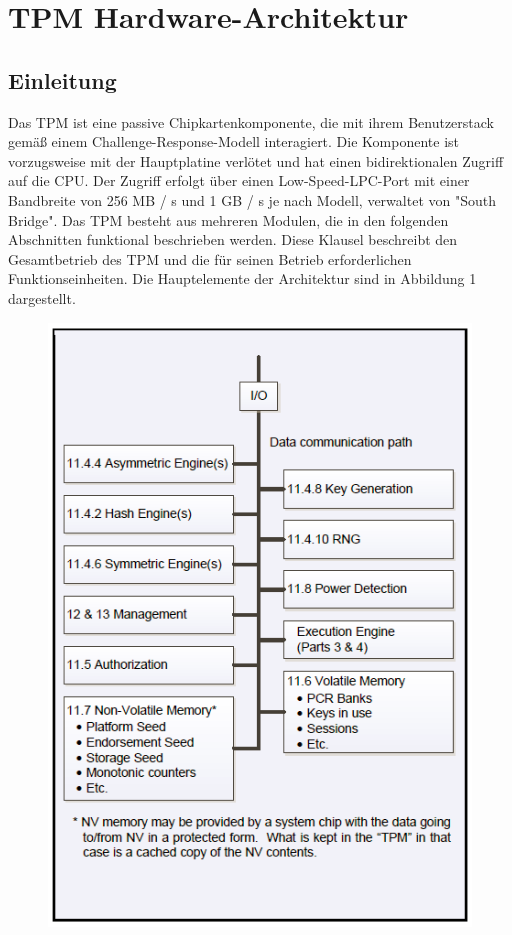 


\chapter{TPM Hardware-Architektur}
\section{Einleitung}

Das TPM ist eine passive Chipkartenkomponente, die mit ihrem Benutzerstack gemäß einem Challenge-Response-Modell interagiert. Die Komponente ist vorzugsweise mit der Hauptplatine verlötet und hat einen bidirektionalen Zugriff auf die CPU.
Der Zugriff erfolgt über einen Low-Speed-LPC-Port mit einer Bandbreite von 256 MB / s und 1 GB / s je nach Modell, verwaltet von "South Bridge". Das TPM besteht aus mehreren Modulen, die in den folgenden Abschnitten funktional beschrieben werden.
Diese Klausel beschreibt den Gesamtbetrieb des TPM und die für seinen Betrieb erforderlichen Funktionseinheiten. Die Hauptelemente der Architektur sind in Abbildung 1 dargestellt.


\begin{figure}[h]
   
\begin{center}
\includegraphics[scale=1]{Abbildung1.PNG} 
\label{fig:strukturvorlage}
\label{fig1}

\end{center}

\end{figure}

